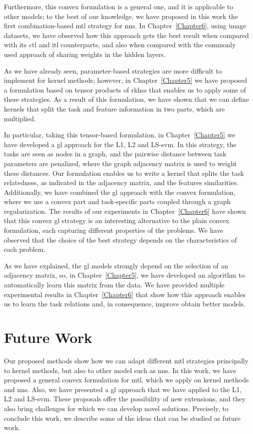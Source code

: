 %
Furthermore, this convex formulation is a general one, and it is applicable to other models; to the best of our knowledge, we have proposed in this work the first combination-based \acrshort{mtl} strategy for \acrshort{nns}.
%
In Chapter~\ref{Chapter6}, using image datasets, we have observed how this approach gets the best result when compared with its \acrshort{ctl} and \acrshort{itl} counterparts, and also when compared with the commonly used approach of sharing weights in the hidden layers.


%
As we have already seen, parameter-based strategies are more difficult to implement for kernel methods; however, in Chapter~\ref{Chapter5} we have proposed a formulation based on tensor products of \acrfull{rkhss} that enables us to apply some of these strategies.
As a result of this formulation, we have shown that we can define kernels that split the task and feature information in two parts, which are multiplied.

In particular, taking this tensor-based formulation, in Chapter~\ref{Chapter5} we have developed a \acrfull{gl} approach for the L1, L2 and LS-\acrshort{svm}. In this strategy, the tasks are seen as nodes in a graph, and the pairwise distance between task parameters are penalized, where the graph adjacency matrix is used to weight these distances.
Our formulation enables us to write a kernel that splits the task relatedness, as indicated in the adjacency matrix, and the features similarities.
%
Additionally, we have combined the \acrshort{gl} approach with the convex formulation, where we use a convex part and task-specific parts coupled through a graph regularization.
%
The results of our experiments in Chapter~\ref{Chapter6} have shown that this convex \acrshort{gl} strategy is an interesting alternative to the plain convex formulation, each capturing different properties of the problems. We have observed that the choice of the best strategy depends on the characteristics of each problem.

As we have explained, the \acrshort{gl} models strongly depend on the selection of an adjacency matrix, so, in Chapter~\ref{Chapter5}, we have developed an algorithm to automatically learn this matrix from the data.
We have provided multiple experimental results in Chapter~\ref{Chapter6} that show how this approach enables us to learn the task relations and, in consequence, improve obtain better models.


\section{Future Work}
Our proposed methods show how we can adapt different \acrshort{mtl} strategies principally to kernel methods, but also to other model such as \acrshort{nns}. 
In this work, we have proposed a general convex formulation for \acrshort{mtl}, which we apply on kernel methods and \acrshort{nns}. Also, we have presented a \acrshort{gl} approach that we have applied to the L1, L2 and LS-\acrshort{svm}.
%
These proposals offer the possibility of new extensions, and they also bring challenges for which we can develop novel solutions. Precisely, to conclude this work, we describe some of the ideas that can be studied as future work.

